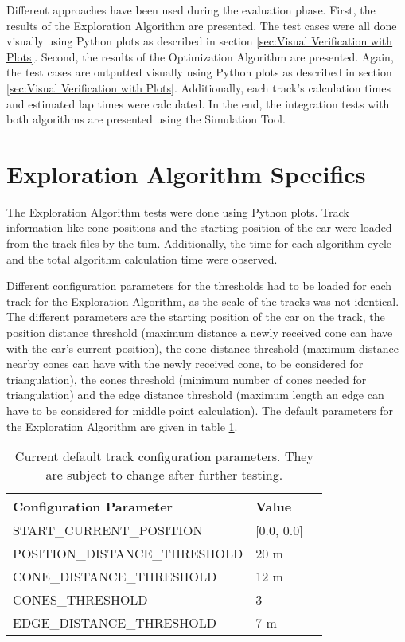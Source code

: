 Different approaches have been used during the evaluation phase. First, the results of the Exploration Algorithm are presented. The test cases were all done visually using Python plots as described in section \ref{sec:Visual Verification with Plots}. Second, the results of the Optimization Algorithm are presented. Again, the test cases are outputted visually using Python plots as described in section \ref{sec:Visual Verification with Plots}. Additionally, each track's calculation times and estimated lap times were calculated. In the end, the integration tests with both algorithms are presented using the Simulation Tool.

\section{Exploration Algorithm Specifics} \label{sec:Exploration Algorithm Specifics}
The Exploration Algorithm tests were done using Python plots. Track information like cone positions and the starting position of the car were loaded from the track files by the \acrlong{tum}. \cite{tumftm_optimization_algoritm} Additionally, the time for each algorithm cycle and the total algorithm calculation time were observed.

Different configuration parameters for the thresholds had to be loaded for each track for the Exploration Algorithm, as the scale of the tracks was not identical. The different parameters are the starting position of the car on the track, the position distance threshold (maximum distance a newly received cone can have with the car's current position), the cone distance threshold (maximum distance nearby cones can have with the newly received cone, to be considered for triangulation), the cones threshold (minimum number of cones needed for triangulation) and the edge distance threshold (maximum length an edge can have to be considered for middle point calculation). The default parameters for the Exploration Algorithm are given in table \ref{tab:Default Track Config for Exploration Algorithm}.
\begin{table}[H]
    \centering
    \begin{tabular}{|l|l|l|}
        \hline
        \textbf{Configuration Parameter} & \textbf{Value} \\ \hline
        START\_CURRENT\_POSITION         & [0.0, 0.0]     \\ \hline
        POSITION\_DISTANCE\_THRESHOLD    & 20 m           \\ \hline
        CONE\_DISTANCE\_THRESHOLD        & 12 m           \\ \hline
        CONES\_THRESHOLD                 & 3              \\ \hline
        EDGE\_DISTANCE\_THRESHOLD        & 7 m            \\ \hline
    \end{tabular}
    \caption{Current default track configuration parameters. They are subject to change after further testing.}
    \label{tab:Default Track Config for Exploration Algorithm}
\end{table}


